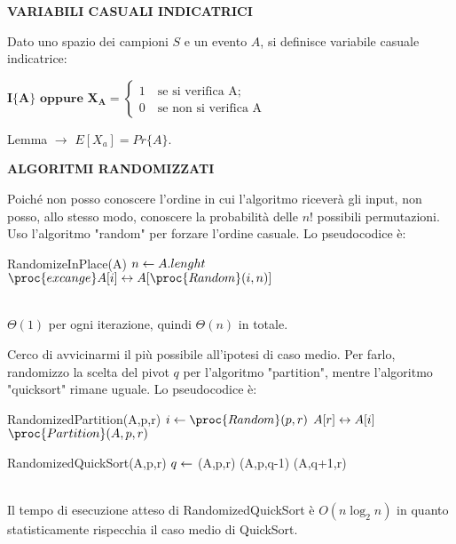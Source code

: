 \documentclass[8pt]{extarticle}
\begin{document}
\begin{formulario}
		\begin{tcenter}
\bf{VARIABILI CASUALI INDICATRICI}
		\end{tcenter}
Dato uno spazio dei campioni $S$ e un evento $A$, si definisce variabile casuale indicatrice:
		\begin{tcenter}
$\bm{I\{A\}\text{ oppure }X_A=}		
		\begin{cases} 
1 \quad\text{se si verifica A;}\\
0 \quad\text{se non si verifica A}  
		\end{cases}$
		\end{tcenter}
		\begin{descr}{0}
\item[Lemma] $\rightarrow$ $E[X_a]=Pr\{ A \}$.
		\end{descr}
\myRule

		\begin{tcenter}
\bf{ALGORITMI RANDOMIZZATI}
		\end{tcenter}
Poiché non posso conoscere l'ordine in cui l'algoritmo riceverà gli input, non posso, allo stesso modo, conoscere la probabilità delle $n!$ possibili permutazioni. Uso l'algoritmo "random" per forzare l'ordine casuale. Lo pseudocodice è:
		\begin{code}{RandomizeInPlace(A)}
\li $n \leftarrow A.lenght$
\li {}
	\li $\proc{excange } A[i]\sse A[\proc{Random}(i,n)]$
\End
		\end{code}
\\
$\Theta(1)$ per ogni iterazione, quindi $\Theta(n)$ in totale.
\myRule

		\begin{tcenter}
		\end{tcenter}
Cerco di avvicinarmi il più possibile all'ipotesi di caso medio. Per farlo, randomizzo la scelta del pivot $q$ per l'algoritmo "partition", mentre l'algoritmo "quicksort" rimane uguale. Lo pseudocodice è: 
		\begin{code}{RandomizedPartition(A,p,r)}
\li $i\la \proc{Random}(p,r)$
\li {}$A[r]\leftrightarrow A[i]$
\li \Return $\proc{Partition} (A,p,r)$

		\end{code}
		\begin{code}{RandomizedQuickSort(A,p,r)}
\li {}
	\li $q\leftarrow$ (A,p,r)
	\li {}(A,p,q-1)
	\li {}(A,q+1,r)
\End
		\end{code}
\\
Il tempo di esecuzione atteso di RandomizedQuickSort è $O(n\log_2n)$ in quanto statisticamente rispecchia il caso medio di QuickSort. 
\myRule


\end{formulario}
\end{document}
